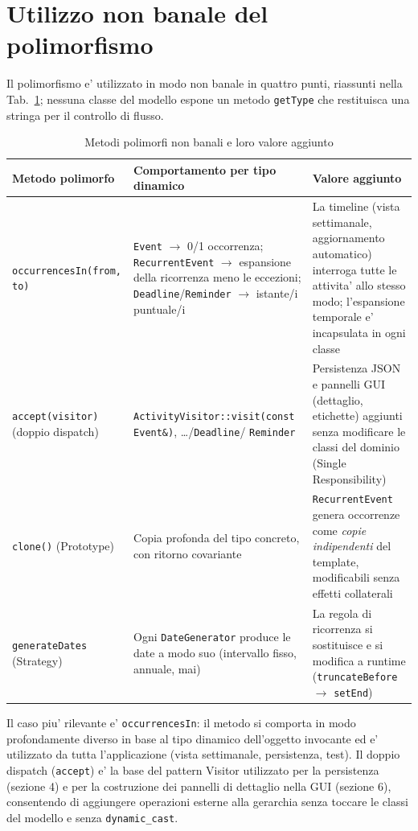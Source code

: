 \documentclass[10pt,a4paper]{article}
\begin{document}
\section{Utilizzo non banale del polimorfismo}

Il polimorfismo e' utilizzato in modo non banale in quattro punti, riassunti
nella Tab.~\ref{tab:poly}; nessuna classe del modello espone un metodo
\texttt{getType} che restituisca una stringa per il controllo di flusso.

\begin{table}[h]
\centering
\begin{tabular}{@{}p{3.2cm} p{7.2cm} p{4.2cm}@{}}
\toprule
\textbf{Metodo polimorfo} & \textbf{Comportamento per tipo dinamico} & \textbf{Valore aggiunto} \\
\midrule
\texttt{occurrencesIn(from, to)} &
\texttt{Event} $\rightarrow$ 0/1 occorrenza; \texttt{RecurrentEvent} $\rightarrow$
espansione della ricorrenza meno le eccezioni; \texttt{Deadline}/\texttt{Reminder}
$\rightarrow$ istante/i puntuale/i &
La timeline (vista settimanale, aggiornamento automatico) interroga tutte le
attivita' allo stesso modo; l'espansione temporale e' incapsulata in ogni classe \\
\addlinespace
\texttt{accept(visitor)} (doppio dispatch) &
\texttt{ActivityVisitor::visit(const Event\&)}, \ldots/\texttt{Deadline}/
\texttt{Reminder} &
Persistenza JSON e pannelli GUI (dettaglio, etichette) aggiunti senza
modificare le classi del dominio (Single Responsibility) \\
\addlinespace
\texttt{clone()} (Prototype) &
Copia profonda del tipo concreto, con ritorno covariante &
\texttt{RecurrentEvent} genera occorrenze come \emph{copie indipendenti} del
template, modificabili senza effetti collaterali \\
\addlinespace
\texttt{generateDates} (Strategy) &
Ogni \texttt{DateGenerator} produce le date a modo suo (intervallo fisso,
annuale, mai) &
La regola di ricorrenza si sostituisce e si modifica a runtime
(\texttt{truncateBefore} $\rightarrow$ \texttt{setEnd}) \\
\bottomrule
\end{tabular}
\caption{Metodi polimorfi non banali e loro valore aggiunto}
\label{tab:poly}
\end{table}

Il caso piu' rilevante e' \texttt{occurrencesIn}: il metodo si comporta in modo
profondamente diverso in base al tipo dinamico dell'oggetto invocante ed e'
utilizzato da tutta l'applicazione (vista settimanale, persistenza, test).
Il doppio dispatch (\texttt{accept}) e' la base del pattern Visitor utilizzato
per la persistenza (sezione 4) e per la costruzione dei pannelli di dettaglio
nella GUI (sezione 6), consentendo di aggiungere operazioni esterne alla
gerarchia senza toccare le classi del modello e senza \texttt{dynamic\_cast}.
\end{document}
